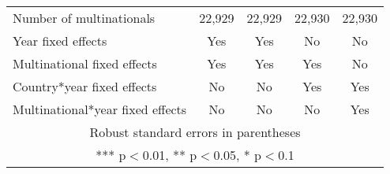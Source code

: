 \begin{longtable}{lcccc}
Number of multinationals & 22,929 & 22,929 & 22,930 & 22,930 \\
Year fixed effects & Yes & Yes & No & No \\
Multinational fixed effects & Yes & Yes & Yes & No \\
Country*year fixed effects & No & No & Yes & Yes \\
 Multinational*year fixed effects & No & No & No & Yes \\ \hline
\multicolumn{5}{c}{ Robust standard errors in parentheses} \\
\multicolumn{5}{c}{ *** p$<$0.01, ** p$<$0.05, * p$<$0.1} \\
\end{longtable}
